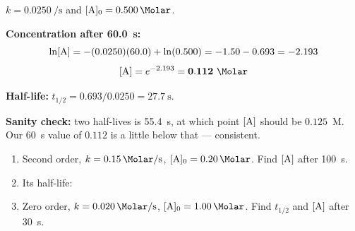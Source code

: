 \documentclass{apchem-notes}
\begin{document}
\begin{workedexample}
$k = \SI{0.0250}{\per\second}$ and $[\ce{A}]_0 = \SI{0.500}{\Molar}$.

\textbf{Concentration after \SI{60.0}{\second}:}
\[ \ln[\ce{A}] = -(0.0250)(60.0) + \ln(0.500) = -1.50 - 0.693 = -2.193 \]
\[ [\ce{A}] = e^{-2.193} = \mathbf{0.112}~\si{\Molar} \]

\textbf{Half-life:} $t_{1/2} = 0.693/0.0250 = \mathbf{27.7}~\si{\second}$.

\textbf{Sanity check:} two half-lives is \SI{55.4}{\second}, at which point
$[\ce{A}]$ should be $0.125$~M. Our \SI{60}{\second} value of $0.112$ is a
little below that --- consistent.
\end{workedexample}


\begin{enumerate}[leftmargin=*,itemsep=0.4em]
  \item Second order, $k = \SI{0.15}{\per\Molar\per\second}$,
        $[\ce{A}]_0 = \SI{0.20}{\Molar}$. Find $[\ce{A}]$ after
        \SI{100}{\second}. \workspace[2.2cm]
  \item Its half-life: 
  \item Zero order, $k = \SI{0.020}{\Molar\per\second}$,
        $[\ce{A}]_0 = \SI{1.00}{\Molar}$. Find $t_{1/2}$ and
        $[\ce{A}]$ after \SI{30}{\second}. \workspace[2cm]
\end{enumerate}

\end{document}
